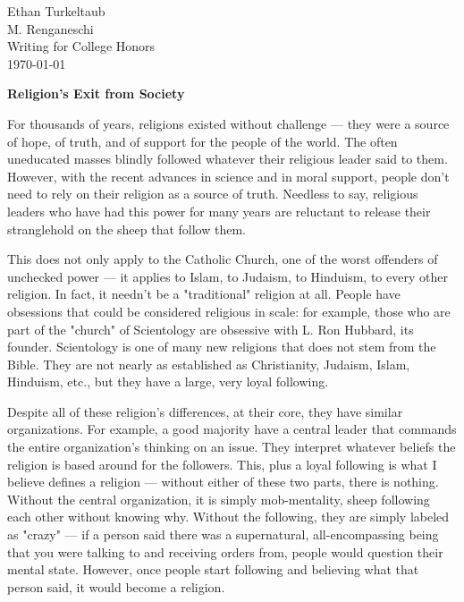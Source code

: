 \documentclass[12pt]{article}
\begin{document}
\begin{flushleft}
Ethan Turkeltaub\\
M. Renganeschi \\
Writing for College Honors \\
\today\\

\begin{center}
\textbf{Religion's Exit from Society}
\end{center}

\setlength{\parindent}{0.5in} 

For thousands of years, religions existed without challenge --- they were a source of hope, of truth, and of support for the people of the world. The often uneducated masses blindly followed whatever their religious leader said to them. However, with the recent advances in science and in moral support, people don't need to rely on their religion as a source of truth. Needless to say, religious leaders who have had this power for many years are reluctant to release their stranglehold on the sheep that follow them.

This does not only apply to the Catholic Church, one of the worst offenders of unchecked power --- it applies to Islam, to Judaism, to Hinduism, to every other religion. In fact, it needn't be a "traditional" religion at all. People have obsessions that could be considered religious in scale: for example, those who are part of the "church" of Scientology are obsessive with L. Ron Hubbard, its founder. Scientology is one of many new religions that does not stem from the Bible. They are not nearly as established as Christianity, Judaism, Islam, Hinduism, etc., but they have a large, very loyal following.

Despite all of these religion's differences, at their core, they have similar organizations. For example, a good majority have a central leader that commands the entire organization's thinking on an issue. They interpret whatever beliefs the religion is based around for the followers. This, plus a loyal following is what I believe defines a religion --- without either of these two parts, there is nothing. Without the central organization, it is simply mob-mentality, sheep following each other without knowing why. Without the following, they are simply labeled as "crazy" --- if a person said there was a supernatural, all-encompassing being that you were talking to and receiving orders from, people would question their mental state. However, once people start following and believing what that person said, it would become a religion.


\end{flushleft}
\end{document}
